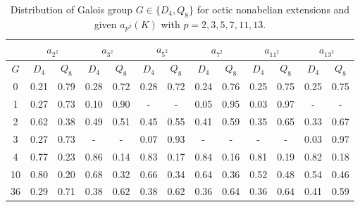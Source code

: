 \documentclass[letterpaper, 10pt]{article}
\newcommand{\1}{\mathds{1}}	%
\theoremstyle{definition}
\theoremstyle{remark}
\begin{document}
\begin{table}[H]
    \begin{center}
        \begin{tabular}{c|c|c|c|c|c|c|c|c|c|c|c|c}
            \toprule
             & \multicolumn{2}{c|}{$a_{2^2}$} & \multicolumn{2}{c|}{$a_{3^2}$} & \multicolumn{2}{c|}{$a_{5^2}$} & \multicolumn{2}{c|}{$a_{7^2}$} & \multicolumn{2}{c|}{$a_{11^2}$} & \multicolumn{2}{c}{$a_{13^2}$} \\
            \midrule
            $G$ & $D_4$ & $Q_8$ & $D_4$ & $Q_8$ & $D_4$ & $Q_8$ & $D_4$ & $Q_8$ & $D_4$ & $Q_8$ & $D_4$ & $Q_8$ \\
            \midrule
            0 & 0.21 & 0.79 & 0.28 & 0.72 & 0.28 & 0.72 & 0.24 & 0.76 & 0.25 & 0.75 & 0.25 & 0.75 \\
            1 & 0.27 & 0.73 & 0.10 & 0.90 & - & - & 0.05 & 0.95 & 0.03 & 0.97 & - & - \\
            2 & 0.62 & 0.38 & 0.49 & 0.51 & 0.45 & 0.55 & 0.41 & 0.59 & 0.35 & 0.65 & 0.33 & 0.67 \\
            3 & 0.27 & 0.73 & - & - & 0.07 & 0.93 & - & - & - & - & 0.03 & 0.97 \\
            4 & 0.77 & 0.23 & 0.86 & 0.14 & 0.83 & 0.17 & 0.84 & 0.16 & 0.81 & 0.19 & 0.82 & 0.18 \\
            10 & 0.80 & 0.20 & 0.68 & 0.32 & 0.66 & 0.34 & 0.64 & 0.36 & 0.52 & 0.48 & 0.54 & 0.46 \\
            36 & 0.29 & 0.71 & 0.38 & 0.62 & 0.38 & 0.62 & 0.36 & 0.64 & 0.36 & 0.64 & 0.41 & 0.59 \\
            \bottomrule
        \end{tabular}
        \caption{Distribution of Galois group $G \in \{D_4, Q_8\}$ for octic nonabelian extensions and given $a_{p^2}(K)$ with $p = 2, 3, 5, 7, 11, 13$.}
        \label{tab:octic_nab_psq_dist_G}
    \end{center}
\end{table}
\end{document}
